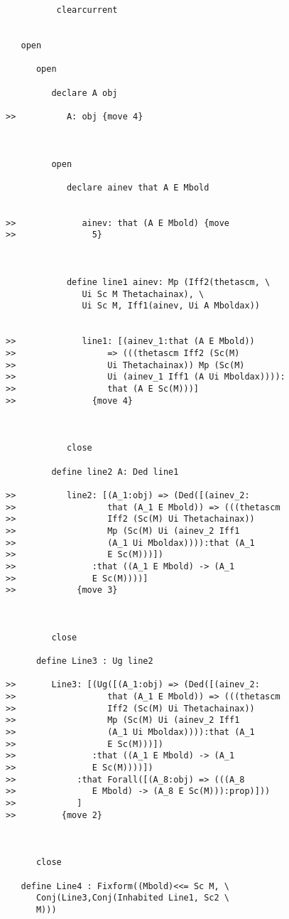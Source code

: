 \documentclass[12pt]{article}
\begin{document}
\begin{verbatim}
          clearcurrent


   open

      open

         declare A obj

>>          A: obj {move 4}



         open

            declare ainev that A E Mbold


>>             ainev: that (A E Mbold) {move
>>               5}



            define line1 ainev: Mp (Iff2(thetascm, \
               Ui Sc M Thetachainax), \
               Ui Sc M, Iff1(ainev, Ui A Mboldax))


>>             line1: [(ainev_1:that (A E Mbold))
>>                  => (((thetascm Iff2 (Sc(M)
>>                  Ui Thetachainax)) Mp (Sc(M)
>>                  Ui (ainev_1 Iff1 (A Ui Mboldax)))):
>>                  that (A E Sc(M)))]
>>               {move 4}



            close

         define line2 A: Ded line1

>>          line2: [(A_1:obj) => (Ded([(ainev_2:
>>                  that (A_1 E Mbold)) => (((thetascm
>>                  Iff2 (Sc(M) Ui Thetachainax))
>>                  Mp (Sc(M) Ui (ainev_2 Iff1
>>                  (A_1 Ui Mboldax)))):that (A_1
>>                  E Sc(M)))])
>>               :that ((A_1 E Mbold) -> (A_1
>>               E Sc(M))))]
>>            {move 3}



         close

      define Line3 : Ug line2

>>       Line3: [(Ug([(A_1:obj) => (Ded([(ainev_2:
>>                  that (A_1 E Mbold)) => (((thetascm
>>                  Iff2 (Sc(M) Ui Thetachainax))
>>                  Mp (Sc(M) Ui (ainev_2 Iff1
>>                  (A_1 Ui Mboldax)))):that (A_1
>>                  E Sc(M)))])
>>               :that ((A_1 E Mbold) -> (A_1
>>               E Sc(M))))])
>>            :that Forall([(A_8:obj) => (((A_8
>>               E Mbold) -> (A_8 E Sc(M))):prop)]))
>>            ]
>>         {move 2}



      close

   define Line4 : Fixform((Mbold)<<= Sc M, \
      Conj(Line3,Conj(Inhabited Line1, Sc2 \
      M)))


\end{verbatim}
\end{document}

